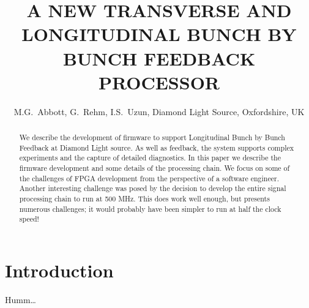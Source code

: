 \documentclass[a4paper]{jacow}
\begin{document}
\title{A NEW TRANSVERSE AND LONGITUDINAL BUNCH BY BUNCH FEEDBACK PROCESSOR}
\author{M.G.~Abbott, G.~Rehm, I.S.~Uzun, Diamond Light Source, Oxfordshire, UK}
\maketitle

\begin{abstract}

We describe the development of firmware to support Longitudinal Bunch by Bunch
Feedback at Diamond Light source.  As well as feedback, the system supports
complex experiments and the capture of detailed diagnostics.  In this paper we
describe the firmware development and some details of the processing chain.  We
focus on some of the challenges of FPGA development from the perspective of a
software engineer.  Another interesting challenge was posed by the decision to
develop the entire signal processing chain to run at 500 MHz.  This does work
well enough, but presents numerous challenges; it would probably have been
simpler to run at half the clock speed!

\end{abstract}


\section{Introduction}

Humm\dots
\end{document}
